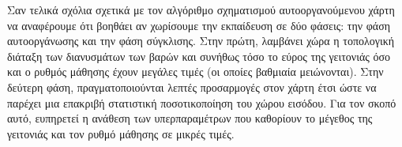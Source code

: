Σαν τελικά σχόλια σχετικά με τον αλγόριθμο σχηματισμού αυτο\textendash οργανούμενου χάρτη να αναφέρουμε ότι βοηθάει αν χωρίσουμε την εκπαίδευση σε δύο φάσεις: την φάση αυτο\textendash οργάνωσης και την φάση σύγκλισης. Στην πρώτη, λαμβάνει χώρα η τοπολογική διάταξη των διανυσμάτων των βαρών και συνήθως τόσο το εύρος της γειτονιάς όσο και ο ρυθμός μάθησης έχουν μεγάλες τιμές (οι οποίες βαθμιαία μειώνονται). Στην δεύτερη φάση, πραγματοποιούνται λεπτές προσαρμογές στον χάρτη έτσι ώστε να παρέχει μια επακριβή στατιστική ποσοτικοποίηση του χώρου εισόδου\cite{haykin2009neural}. Για τον σκοπό αυτό, ευπηρετεί η ανάθεση των υπερπαραμέτρων που καθορίουν το μέγεθος της γειτονιάς και τον ρυθμό μάθησης σε μικρές τιμές.


